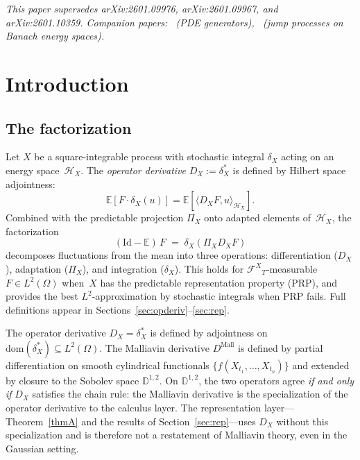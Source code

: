 \documentclass[11pt,a4paper]{article}
\theoremstyle{plain}
\theoremstyle{definition}
\theoremstyle{remark}
\newcommand{\E}{\mathbb{E}}
\newcommand{\Id}{\mathrm{Id}}
\newcommand{\dom}{\mathrm{dom}}
\newcommand{\HX}{\mathcal{H}_X}
\newcommand{\FX}{\mathcal{F}^X}
\begin{document}
\noindent\textit{This paper supersedes arXiv:2601.09976, arXiv:2601.09967, and arXiv:2601.10359. Companion papers:~\cite{Fontes2026PDE_gen} (PDE generators),~\cite{Fontes2026Banach} (jump processes on Banach energy spaces).}


\section{Introduction}\label{sec:intro}

\subsection{The factorization}

Let $X$ be a square-integrable process with stochastic integral $\delta_X$ acting on an energy space~$\HX$. The \emph{operator derivative} $D_X := \delta_X^*$ is defined by Hilbert space adjointness:
\begin{equation}\label{eq:factorization_intro}
\E[F \cdot \delta_X(u)] = \E[\langle D_X F, u \rangle_{\HX}].
\end{equation}
Combined with the predictable projection $\Pi_X$ onto adapted elements of~$\HX$, the factorization
\begin{equation}\label{eq:factorization}
(\Id - \E)\,F \;=\; \delta_X(\Pi_X D_X F)
\end{equation}
decomposes fluctuations from the mean into three operations: differentiation ($D_X$), adaptation ($\Pi_X$), and integration ($\delta_X$). This holds for ${\FX}_T$-measurable $F \in L^2(\Omega)$ when~$X$ has the predictable representation property (PRP), and provides the best $L^2$-approximation by stochastic integrals when PRP fails. Full definitions appear in Sections~\ref{sec:opderiv}--\ref{sec:rep}.

The operator derivative $D_X = \delta_X^*$ is defined by adjointness on $\dom(\delta_X^*) \subseteq L^2(\Omega)$. The Malliavin derivative $D^{\mathrm{Mall}}$ is defined by partial differentiation on smooth cylindrical functionals $\{f(X_{t_1},\ldots,X_{t_n})\}$ and extended by closure to the Sobolev space $\mathbb{D}^{1,2}$. On $\mathbb{D}^{1,2}$, the two operators agree \emph{if and only if} $D_X$ satisfies the chain rule: the Malliavin derivative is the specialization of the operator derivative to the calculus layer. The representation layer---Theorem~\ref{thmA} and the results of Section~\ref{sec:rep}---uses $D_X$ without this specialization and is therefore not a restatement of Malliavin theory, even in the Gaussian setting.
\end{document}
